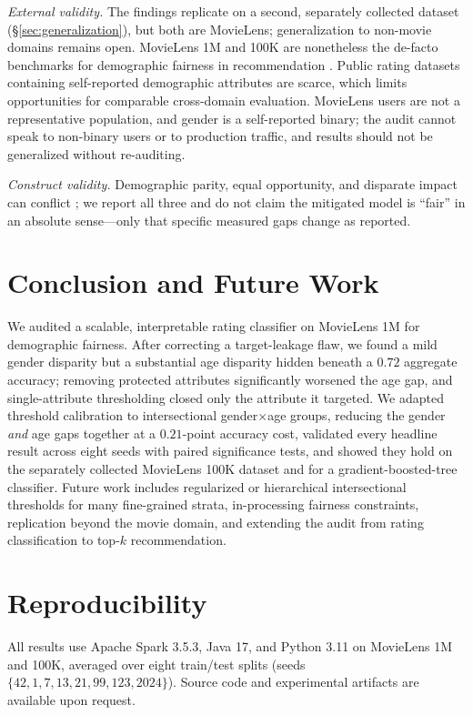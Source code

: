 \documentclass[conference]{IEEEtran}
\begin{document}
\textit{External validity.} The findings replicate on a second, separately collected
dataset (\S\ref{sec:generalization}), but both are MovieLens; generalization to
non-movie domains remains open. MovieLens 1M and 100K are nonetheless the de-facto
benchmarks for demographic fairness in recommendation \cite{ekstrand2018all}. Public
rating datasets containing self-reported demographic attributes are scarce, which
limits opportunities for comparable cross-domain evaluation. MovieLens users are not
a representative population, and gender is a self-reported binary; the audit cannot
speak to non-binary users or to production traffic, and results should not be
generalized without re-auditing.

\textit{Construct validity.} Demographic parity, equal opportunity, and disparate
impact can conflict \cite{verma2018fairness}; we report all three and do not claim
the mitigated model is ``fair'' in an absolute sense---only that specific measured
gaps change as reported.

\section{Conclusion and Future Work}
We audited a scalable, interpretable rating classifier on MovieLens 1M for
demographic fairness. After correcting a target-leakage flaw, we found a mild gender
disparity but a substantial age disparity hidden beneath a $0.72$ aggregate accuracy;
removing protected attributes significantly worsened the age gap, and single-attribute
thresholding closed only the attribute it targeted. We adapted threshold calibration
to intersectional gender$\times$age groups, reducing the gender \emph{and} age gaps
together at a $0.21$-point accuracy cost, validated every headline result across eight
seeds with paired significance tests, and showed they hold on the separately collected
MovieLens 100K dataset and for a gradient-boosted-tree classifier. Future work includes
regularized or hierarchical intersectional thresholds for many fine-grained strata,
in-processing fairness constraints, replication beyond the movie domain, and extending the
audit from rating classification to top-$k$ recommendation.

\section*{Reproducibility}
All results use Apache Spark 3.5.3, Java 17, and Python 3.11 on MovieLens 1M and 100K, averaged over eight train/test splits (seeds $\{42,1,7,13,21,99,123,2024\}$). Source code and experimental artifacts are available upon request.
\end{document}
